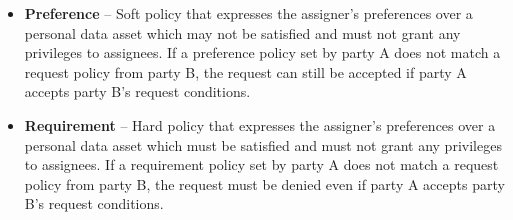 \begin{itemize}
    \item \textbf{Preference} -- Soft policy that expresses the assigner's preferences over a personal data asset which may not be satisfied and must not grant any privileges to assignees. If a preference policy set by party A does not match a request policy from party B, the request can still be accepted if party A accepts party B's request conditions.
    \item \textbf{Requirement} -- Hard policy that expresses the assigner's preferences over a personal data asset which must be satisfied and must not grant any privileges to assignees. If a requirement policy set by party A does not match a request policy from party B, the request must be denied even if party A accepts party B's request conditions.
\end{itemize}

\begin{table}[htbp]
\centering
\caption{Classes and named individuals specified in the OAC profile.}
\label{tab:profile_classes}
\end{table}

